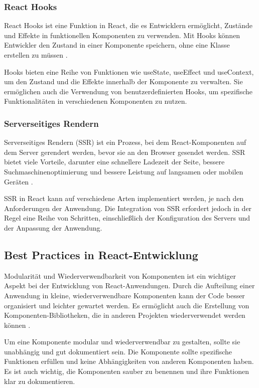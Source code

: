 \subsubsection{React Hooks}
React Hooks ist eine Funktion in React, die es Entwicklern ermöglicht, Zustände und Effekte in funktionellen Komponenten zu verwenden. Mit Hooks können Entwickler den Zustand in einer Komponente speichern, ohne eine Klasse erstellen zu müssen \cite{reacthooksintro, w3schoolsHooks}.

Hooks bieten eine Reihe von Funktionen wie useState, useEffect und useContext, um den Zustand und die Effekte innerhalb der Komponente zu verwalten. Sie ermöglichen auch die Verwendung von benutzerdefinierten Hooks, um spezifische Funktionalitäten in verschiedenen Komponenten zu nutzen.
\subsubsection{Serverseitiges Rendern}
Serverseitiges Rendern (SSR) ist ein Prozess, bei dem React-Komponenten auf dem Server gerendert werden, bevor sie an den Browser gesendet werden. SSR bietet viele Vorteile, darunter eine schnellere Ladezeit der Seite, bessere Suchmaschinenoptimierung und bessere Leistung auf langsamen oder mobilen Geräten \cite{reactssr1, reactssr2}.

SSR in React kann auf verschiedene Arten implementiert werden, je nach den Anforderungen der Anwendung. Die Integration von SSR erfordert jedoch in der Regel eine Reihe von Schritten, einschließlich der Konfiguration des Servers und der Anpassung der Anwendung.

\subsection{Best Practices in React-Entwicklung}
Modularität und Wiederverwendbarkeit von Komponenten ist ein wichtiger Aspekt bei der Entwicklung von React-Anwendungen. Durch die Aufteilung einer Anwendung in kleine, wiederverwendbare Komponenten kann der Code besser organisiert und leichter gewartet werden. Es ermöglicht auch die Erstellung von Komponenten-Bibliotheken, die in anderen Projekten wiederverwendet werden können \cite{dhiwise, reactcomponentlibrary}.

Um eine Komponente modular und wiederverwendbar zu gestalten, sollte sie unabhängig und gut dokumentiert sein. Die Komponente sollte spezifische Funktionen erfüllen und keine Abhängigkeiten von anderen Komponenten haben. Es ist auch wichtig, die Komponenten sauber zu benennen und ihre Funktionen klar zu dokumentieren.
